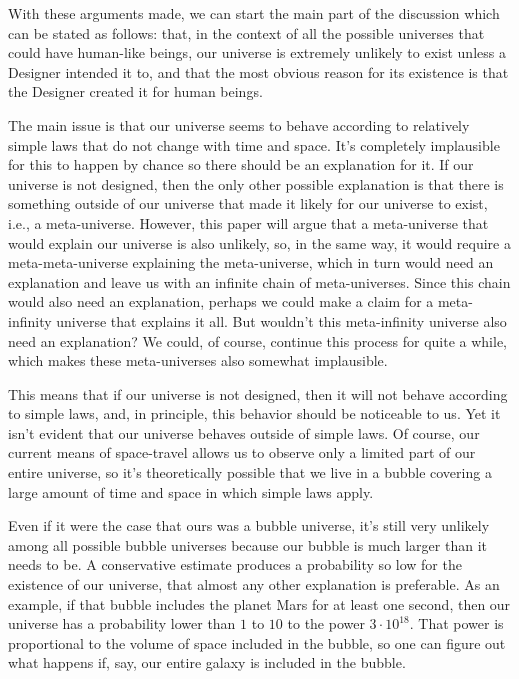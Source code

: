 \documentclass[a4paper
,draft
]{article}
\begin{document}
With these arguments made, we can start the main part of the discussion
which can be stated as follows: that, in the context of all the possible universes that could
have human-like beings, our universe is extremely unlikely to exist
unless a Designer
intended it to, and that the most obvious reason for its existence is
that the Designer created it for human beings.

The main issue is that our universe seems to behave according to relatively
simple laws that do not change with time and space.
It's completely implausible for this to happen by chance so there should be
an explanation for it.
If our universe is not designed, then the only other possible explanation is that
there is something outside of our universe that made it likely for our universe
to exist, i.e., a meta-universe.
However, this paper will argue that a meta-universe that
would explain our universe is also unlikely, so, in the same way,
it would require a meta-meta-universe explaining the meta-universe,
which in turn would need an explanation and leave us with an infinite chain
of meta-universes.
Since this chain would also need an explanation, perhaps we could make a
claim for a meta-infinity universe that explains it all.
But wouldn't this meta-infinity universe also need an explanation?
We could, of course,
continue this process for quite a while,
which makes these meta-universes also somewhat implausible.

This means that if our universe is not designed, then it will not behave
according to simple laws, and, in principle, this behavior should be
noticeable to us.
Yet it isn't evident that our universe behaves outside of simple laws.
Of course, our current means of space-travel allows us to observe only a limited
part of our entire universe, so it's theoretically possible that we live
in a bubble covering
a large amount of time and space in which simple laws apply.

Even if it were the case that ours was a bubble universe,
it's still very unlikely among all possible bubble universes
because our bubble is much larger than it needs to be.
A conservative estimate produces a probability so low for the existence of our universe,
that almost any other explanation is preferable.
As an example, if that bubble includes the planet Mars for at least one second,
then our universe has a probability lower than $1$ to $10$ to the power $3·10^18$.
That power is proportional to the volume of space included in the bubble,
so one can figure out what happens if, say,
our entire galaxy is included in the bubble.
\end{document}
